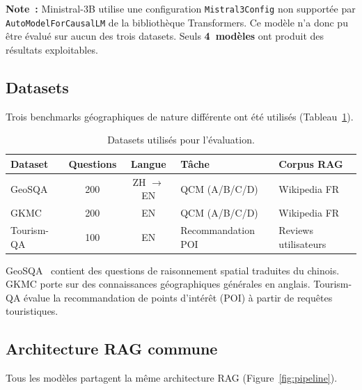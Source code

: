 \documentclass[12pt,a4paper]{article}
\begin{document}
\textbf{Note~:} Ministral-3B utilise une configuration \texttt{Mistral3Config} non support\'ee par \texttt{AutoModelForCausalLM} de la biblioth\`eque Transformers. Ce mod\`ele n'a donc pu \^etre \'evalu\'e sur aucun des trois datasets. Seuls \textbf{4~mod\`eles} ont produit des r\'esultats exploitables.

\subsection{Datasets}

Trois benchmarks g\'eographiques de nature diff\'erente ont \'et\'e utilis\'es (Tableau~\ref{tab:datasets}).

\begin{table}[H]
\centering
\caption{Datasets utilis\'es pour l'\'evaluation.}
\label{tab:datasets}
\begin{tabular}{lccll}
\toprule
\textbf{Dataset} & \textbf{Questions} & \textbf{Langue} & \textbf{T\^ache} & \textbf{Corpus RAG} \\
\midrule
GeoSQA & 200 & ZH $\to$ EN & QCM (A/B/C/D) & Wikipedia FR \\
GKMC & 200 & EN & QCM (A/B/C/D) & Wikipedia FR \\
Tourism-QA & 100 & EN & Recommandation POI & Reviews utilisateurs \\
\bottomrule
\end{tabular}
\end{table}

GeoSQA~\cite{huang_geosqa_2019} contient des questions de raisonnement spatial traduites du chinois. GKMC porte sur des connaissances g\'eographiques g\'en\'erales en anglais. Tourism-QA \'evalue la recommandation de points d'int\'er\^et (POI) \`a partir de requ\^etes touristiques.

\subsection{Architecture RAG commune}

Tous les mod\`eles partagent la m\^eme architecture RAG (Figure~\ref{fig:pipeline}).
\end{document}
